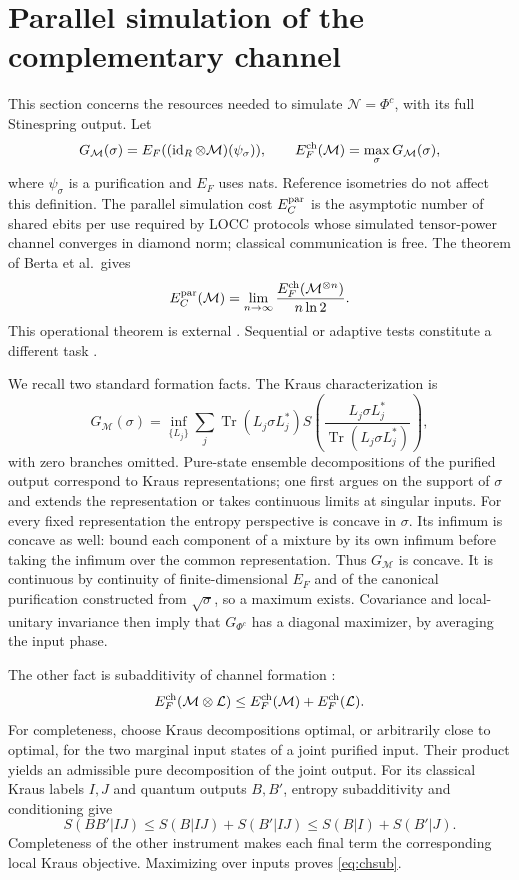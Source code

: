 \documentclass[11pt]{article}
\begin{document}
\section{Parallel simulation of the complementary channel}\label{sec:simulation}
This section concerns the resources needed to simulate $\mathcal N=\Phi^c$,
with its full Stinespring output. Let
\[
 G_{\mathcal M}(\sigma)=E_F((\operatorname{id}_R\otimes\mathcal M)(\psi_\sigma)),
 \qquad E_F^{\rm ch}(\mathcal M)=\max_\sigma G_{\mathcal M}(\sigma),
\]
where $\psi_\sigma$ is a purification and $E_F$ uses nats. Reference isometries
do not affect this definition. The parallel simulation cost $E_C^{\rm par}$
is the asymptotic number of shared ebits per use required by LOCC protocols
whose simulated tensor-power channel converges in diamond norm; classical
communication is free. The theorem of Berta et al.\ gives
\begin{equation}\label{eq:channelcostreg}
 E_C^{\rm par}(\mathcal M)=\lim_{n\to\infty}
       \frac{E_F^{\rm ch}(\mathcal M^{\otimes n})}{n\ln2}.
\end{equation}
This operational theorem is external \cite[Theorem 12]{bcbw}. Sequential or
adaptive tests constitute a different task \cite{wilde}.

We recall two standard formation facts. The Kraus characterization is
\[
 G_{\mathcal M}(\sigma)=\inf_{\{L_j\}}
 \sum_j\operatorname{Tr}(L_j\sigma L_j^*)
 S\left(\frac{L_j\sigma L_j^*}{\operatorname{Tr}(L_j\sigma L_j^*)}\right),
\]
with zero branches omitted. Pure-state ensemble decompositions of the
purified output correspond to Kraus representations; one first argues on
the support of $\sigma$ and extends the representation or takes continuous
limits at singular inputs. For every fixed representation the entropy
perspective is concave in $\sigma$. Its infimum is concave as well: bound
each component of a mixture by its own infimum before taking the infimum
over the common representation. Thus $G_{\mathcal M}$ is concave. It is
continuous by continuity of finite-dimensional $E_F$ and of the canonical
purification constructed from $\sqrt\sigma$, so a maximum exists. Covariance
and local-unitary invariance then imply that $G_{\Phi^c}$ has a diagonal
maximizer, by averaging the input phase.

The other fact is subadditivity of channel formation
\cite[Appendix C]{tang}:
\begin{equation}\label{eq:chsub}
 E_F^{\rm ch}(\mathcal M\otimes\mathcal L)
 \le E_F^{\rm ch}(\mathcal M)+E_F^{\rm ch}(\mathcal L).
\end{equation}
For completeness, choose Kraus decompositions optimal, or arbitrarily close
to optimal, for the two marginal input states of a joint purified input.
Their product yields an admissible pure decomposition of the joint output.
For its classical Kraus labels $I,J$ and quantum outputs $B,B'$, entropy
subadditivity and conditioning give
\[
 S(BB'|IJ)\le S(B|IJ)+S(B'|IJ)
             \le S(B|I)+S(B'|J).
\]
Completeness of the other instrument makes each final term the corresponding
local Kraus objective. Maximizing over inputs proves \eqref{eq:chsub}.
\end{document}
